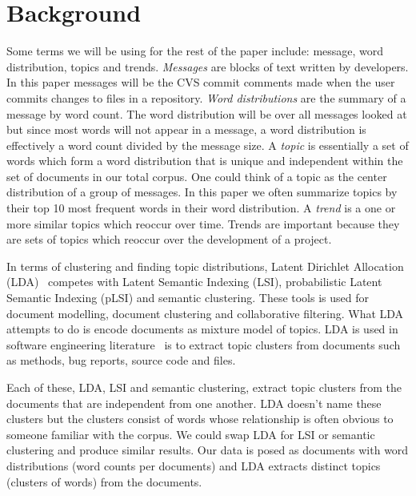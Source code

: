 \documentclass[times, 10pt,twocolumn]{article}
\begin{document}
\section{Background}


Some terms we will be using for the rest of the paper include:
message, word distribution, topics and trends. \emph{Messages} are
blocks of text written by developers. In this paper messages will be
the CVS commit comments made when the user commits changes to files in
a repository. \emph{Word distributions} are the summary of a message
by word count. The word distribution will be over all messages looked
at but since most words will not appear in a message, a word
distribution is effectively a word count divided by the message
size. A \emph{topic} is essentially a set of words which form a word
distribution that is unique and independent within the set of
documents in our total corpus. One could think of a topic as the
center distribution of a group of messages. In this paper we often
summarize topics by their top 10 most frequent words in their word
distribution.  A \emph{trend} is a one or more similar topics which
reoccur over time. Trends are important because they are sets of
topics which reoccur over the development of a project.




In terms of clustering and finding topic distributions, Latent
Dirichlet Allocation (LDA)~\cite{944937} competes with Latent Semantic
Indexing (LSI), probabilistic Latent Semantic Indexing (pLSI) and
semantic clustering. These tools is used for document modelling,
document clustering and collaborative filtering. What LDA attempts to
do is encode documents as mixture model of topics.  LDA is used in
software engineering
literature~\cite{lukins2008,10.1109/MSR.2007.20,NIPS2007637,1321709}
is to extract topic clusters from documents such as methods, bug
reports, source code and files.

Each of these, LDA, LSI and semantic clustering, extract topic
clusters from the documents that are independent from one another. LDA
doesn't name these clusters but the clusters consist of words whose
relationship is often obvious to someone familiar with the corpus. We
could swap LDA for LSI or semantic clustering and produce similar
results. Our data is posed as documents with word distributions (word
counts per documents) and LDA extracts distinct topics (clusters of
words) from the documents.
\end{document}

